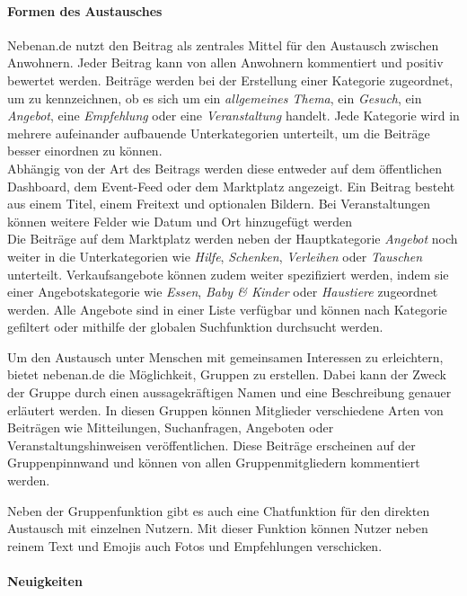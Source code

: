 \paragraph{Formen des Austausches}

Nebenan.de nutzt den Beitrag als zentrales Mittel für den Austausch zwischen Anwohnern. Jeder Beitrag kann von allen Anwohnern kommentiert und positiv bewertet werden. Beiträge werden bei der Erstellung einer Kategorie zugeordnet, um zu kennzeichnen, ob es sich um ein \textit{allgemeines Thema}, ein \textit{Gesuch}, ein \textit{Angebot}, eine \textit{Empfehlung} oder eine \textit{Veranstaltung} handelt. Jede Kategorie wird in mehrere aufeinander aufbauende Unterkategorien unterteilt, um die Beiträge besser einordnen zu können. \\
Abhängig von der Art des Beitrags werden diese entweder auf dem öffentlichen Dashboard, dem Event-Feed oder dem Marktplatz angezeigt. Ein Beitrag besteht aus einem Titel, einem Freitext und optionalen Bildern. Bei Veranstaltungen können weitere Felder wie Datum und Ort hinzugefügt werden \\
Die Beiträge auf dem Marktplatz werden neben der Hauptkategorie \textit{Angebot} noch weiter in die Unterkategorien wie \textit{Hilfe}, \textit{Schenken}, \textit{Verleihen} oder \textit{Tauschen} unterteilt. Verkaufsangebote können zudem weiter spezifiziert werden, indem sie einer Angebotskategorie wie \textit{Essen}, \textit{Baby \& Kinder} oder \textit{Haustiere} zugeordnet werden. Alle Angebote sind in einer Liste verfügbar und können nach Kategorie gefiltert oder mithilfe der globalen Suchfunktion durchsucht werden.

Um den Austausch unter Menschen mit gemeinsamen Interessen zu erleichtern, bietet nebenan.de die Möglichkeit, Gruppen zu erstellen. Dabei kann der Zweck der Gruppe durch einen aussagekräftigen Namen und eine Beschreibung genauer erläutert werden. In diesen Gruppen können Mitglieder verschiedene Arten von Beiträgen wie Mitteilungen, Suchanfragen, Angeboten oder Veranstaltungshinweisen veröffentlichen. Diese Beiträge erscheinen auf der Gruppenpinnwand und können von allen Gruppenmitgliedern kommentiert werden.

Neben der Gruppenfunktion gibt es auch eine Chatfunktion für den direkten Austausch mit einzelnen Nutzern. Mit dieser Funktion können Nutzer neben reinem Text und Emojis auch Fotos und Empfehlungen verschicken.

\paragraph{Neuigkeiten}

